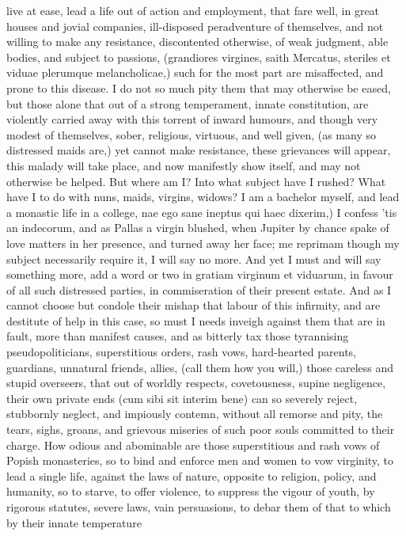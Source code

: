 {live at ease, lead a life out of action and employment, that fare well,
in great houses and jovial companies, ill-disposed peradventure of
themselves, and not willing to make any resistance, discontented
otherwise, of weak judgment, able bodies, and subject to passions,
(grandiores virgines, saith Mercatus, steriles et viduae plerumque
melancholicae,) such for the most part are misaffected, and prone to
this disease. I do not so much pity them that may otherwise be eased,
but those alone that out of a strong temperament, innate constitution,
are violently carried away with this torrent of inward humours, and
though very modest of themselves, sober, religious, virtuous, and well
given, (as many so distressed maids are,) yet cannot make resistance,
these grievances will appear, this malady will take place, and now
manifestly show itself, and may not otherwise be helped. But where am
I? Into what subject have I rushed? What have I to do with nuns, maids,
virgins, widows? I am a bachelor myself, and lead a monastic life in a
college, nae ego sane ineptus qui haec dixerim,) I confess 'tis an
indecorum, and as Pallas a virgin blushed, when Jupiter by chance spake
of love matters in her presence, and turned away her face; me reprimam
though my subject necessarily require it, I will say no more.
And yet I must and will say something more, add a word or two in
gratiam virginum et viduarum, in favour of all such distressed parties,
in commiseration of their present estate. And as I cannot choose but
condole their mishap that labour of this infirmity, and are destitute
of help in this case, so must I needs inveigh against them that are in
fault, more than manifest causes, and as bitterly tax those tyrannising
pseudopoliticians, superstitious orders, rash vows, hard-hearted
parents, guardians, unnatural friends, allies, (call them how you
will,) those careless and stupid overseers, that out of worldly
respects, covetousness, supine negligence, their own private ends (cum
sibi sit interim bene) can so severely reject, stubbornly neglect, and
impiously contemn, without all remorse and pity, the tears, sighs,
groans, and grievous miseries of such poor souls committed to their
charge. How odious and abominable are those superstitious and rash vows
of Popish monasteries, so to bind and enforce men and women to vow
virginity, to lead a single life, against the laws of nature, opposite
to religion, policy, and humanity, so to starve, to offer violence, to
suppress the vigour of youth, by rigorous statutes, severe laws, vain
persuasions, to debar them of that to which by their innate temperature
}
